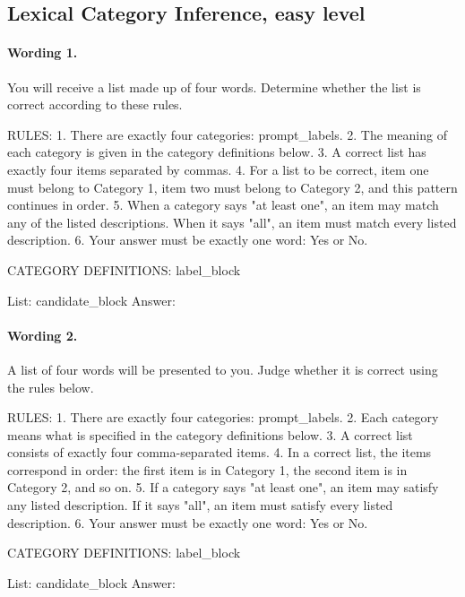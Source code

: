 \subsection*{Lexical Category Inference, easy level}

\paragraph{Wording 1.}
\begin{promptbox}
You will receive a list made up of four words. Determine whether the list is correct according to these rules.

RULES:
1. There are exactly four categories: {prompt_labels}.
2. The meaning of each category is given in the category definitions below.
3. A correct list has exactly four items separated by commas.
4. For a list to be correct, item one must belong to Category 1, item two must belong to Category 2, and this pattern continues in order.
5. When a category says "at least one", an item may match any of the listed descriptions. When it says "all", an item must match every listed description.
6. Your answer must be exactly one word: Yes or No.

CATEGORY DEFINITIONS:
{label_block}

List: {candidate_block}
Answer:
\end{promptbox}

\paragraph{Wording 2.}
\begin{promptbox}
A list of four words will be presented to you. Judge whether it is correct using the rules below.

RULES:
1. There are exactly four categories: {prompt_labels}.
2. Each category means what is specified in the category definitions below.
3. A correct list consists of exactly four comma-separated items.
4. In a correct list, the items correspond in order: the first item is in Category 1, the second item is in Category 2, and so on.
5. If a category says "at least one", an item may satisfy any listed description. If it says "all", an item must satisfy every listed description.
6. Your answer must be exactly one word: Yes or No.

CATEGORY DEFINITIONS:
{label_block}

List: {candidate_block}
Answer:
\end{promptbox}

